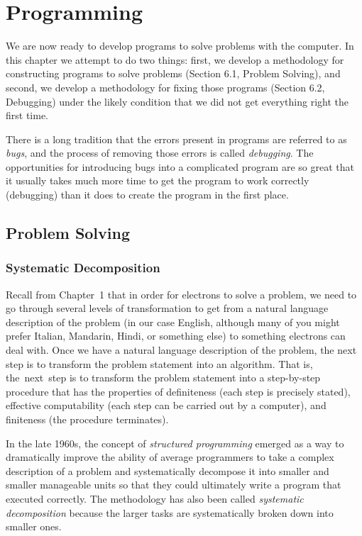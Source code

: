 \documentclass{patt}
\begin{document}
\chapter{Programming}
\label{chapt:programming}

We are now ready to develop programs to solve problems with
the computer. In this chapter we attempt to do two things: first, we
develop a methodology for constructing programs to solve problems 
(Section 6.1, Problem Solving), and second, we develop a methodology 
for fixing those programs 
(Section 6.2, Debugging) under the likely
condition that we did not get everything right the first time.  

There is a long tradition that the errors present in programs are referred 
to as {\em bugs}, and the process of removing those errors is called
{\em debugging}.  The opportunities for introducing bugs into a 
complicated program are
so great that it usually takes much more time to get the program to
work correctly (debugging) than it does to create the program in 
the first place.

\enlargethispage{-\baselineskip}
\vspace{-20pt}
\section{Problem Solving}
\subsection{Systematic Decomposition}

 Recall from Chapter~1 that in order for electrons to
solve a problem, we need to go through several levels of
transformation to get from a natural language description of the
problem (in our case English, although many of you might prefer
Italian, Mandarin, Hindi, or something else) to something electrons
can deal with. Once we have a natural language description of the
problem, the next step is to transform the problem statement into an
algorithm. That is, the~next~step is to transform the problem
statement into a step-by-step procedure that has the properties of
definiteness (each step is precisely stated), effective computability 
(each step can be carried out by a computer), and finiteness (the 
procedure terminates).

In the late 1960s, the concept of {\em structured programming} emerged
as a way to dramatically improve the ability of average programmers to take a
complex description of a problem and systematically decompose it into
smaller and smaller manageable units so that they could ultimately
write a program that executed correctly.  The methodology has also
been called {\em systematic decomposition}  
because the larger tasks are systematically broken down into smaller ones.
\end{document}
